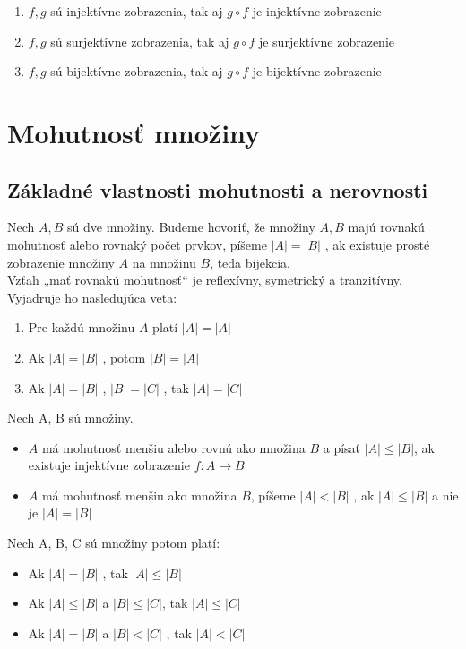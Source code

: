 		\begin{enumerate}
		\item $f , g$ sú injektívne zobrazenia, tak aj $g \circ f$ je injektívne zobrazenie
		\item $f , g$ sú surjektívne zobrazenia, tak aj $g \circ f$ je surjektívne zobrazenie
		\item $f , g$ sú bijektívne zobrazenia, tak aj $g \circ f$ je bijektívne zobrazenie
		\end{enumerate}


\section {Mohutnosť množiny}
	\subsection*{Základné vlastnosti mohutnosti a nerovnosti}
		Nech $A, B$ sú dve množiny. Budeme hovoriť, že množiny $A, B$ majú rovnakú mohutnosť alebo rovnaký počet prvkov, píšeme $|A| = |B|$ , ak existuje prosté zobrazenie množiny $A$ na množinu $B$, teda bijekcia.\\

		Vzťah „mať rovnakú mohutnosť“ je reflexívny, symetrický a tranzitívny. Vyjadruje ho nasledujúca veta:
		\begin{enumerate}
			\item Pre každú množinu $A$ platí $|A| = |A|$ 
			\item Ak $|A| = |B|$ , potom $|B| = |A|$
			\item Ak $|A| = |B|$ , $|B| = |C|$ , tak $|A| = |C|$
		\end{enumerate}


	Nech A, B sú množiny.
	\begin{itemize}
		\item $A$ má mohutnosť menšiu alebo rovnú ako množina $B$ a písať $|A| \leq |B|$, ak existuje injektívne zobrazenie $f : A \rightarrow B$
		\item $A$ má mohutnosť menšiu ako množina $B$, píšeme $|A| < |B|$ , ak $|A| \leq |B|$ a nie je $|A| = |B|$
	\end{itemize}

	Nech A, B, C sú množiny potom platí:
	\begin{itemize}
		\item Ak $|A| = |B|$ , tak $|A| \leq |B|$
		\item Ak $|A| \leq |B|$ a $|B| \leq |C|$, tak $|A| \leq |C|$
		\item Ak $|A| = |B|$ a $|B| < |C|$ , tak $|A| < |C|$
	\end{itemize}


